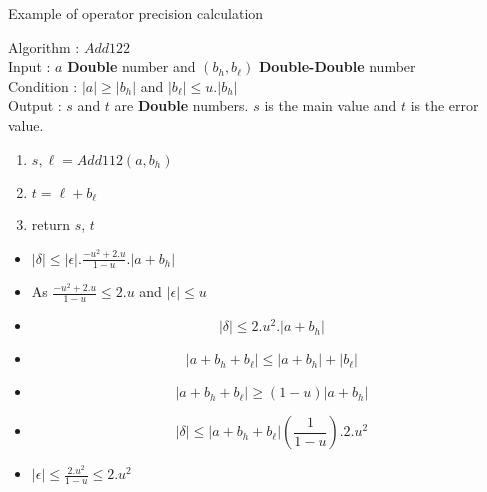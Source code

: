 \begin{frame}{Example of operator precision calculation}
 \tiny 
  \begin{algo}{Algorithm : \textbf{$Add122$}}\\
Input : $a$ \textbf{Double} number and $(b_h,b_{\ell})$  \textbf{Double-Double} number\\
Condition : $\lvert a \rvert \ge \lvert b_h \rvert $ and $\lvert b_{\ell} \rvert \le u. \lvert b_h \rvert$\\
Output : $s$ and $t$ are \textbf{Double} numbers. $s$ is the main value and $t$ is the error value.
\begin{enumerate}
\item $s,\ell = Add112(a,b_h)$\\ 
 \item   $t = \ell +b_{\ell}$\\ 
 \item   return $s$, $t$
\end{enumerate}
\end{algo}
\begin{itemize} 
 \item $\lvert \delta \rvert \le \lvert \epsilon \rvert .\frac{-u^2+2.u}{1-u}. \lvert a + b_h \rvert $\\
 \item  As $\frac{-u^2+2.u}{1-u} \le 2.u$ and $\lvert \epsilon \rvert \le u$
 \item  $$\lvert \delta \rvert \le 2.u^2. \lvert a + b_h \rvert $$
 \item $$ \lvert  a + b_h  + b_{\ell} \rvert \le \lvert a + b_h\rvert +  \lvert b_{\ell}\rvert$$
 \item $$ \lvert  a + b_h  + b_{\ell} \rvert \ge (1 - u)\lvert a + b_h\rvert $$
 \item $$\lvert \delta \rvert \le \lvert a + b_h + b_{\ell} \rvert (\frac{1}{1-u}).2.u^2$$
 \item $\lvert \epsilon \rvert \le \frac{2.u^2}{1-u} \le 2.u^2$
\end{itemize}
\end{frame}

